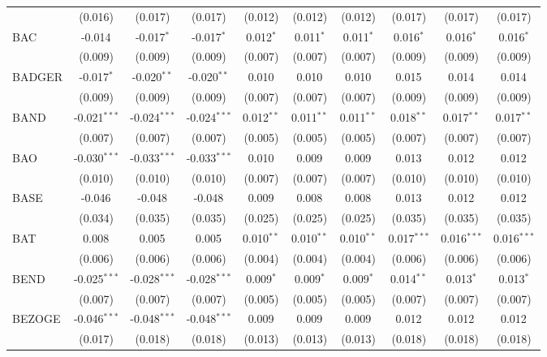 \begin{table}[!htbp]
\begin{tabular}{@{\extracolsep{5pt}}lccccccccc}
  & (0.016) & (0.017) & (0.017) & (0.012) & (0.012) & (0.012) & (0.017) & (0.017) & (0.017) \\
 BAC & -0.014$^{}$ & -0.017$^{*}$ & -0.017$^{*}$ & 0.012$^{*}$ & 0.011$^{*}$ & 0.011$^{*}$ & 0.016$^{*}$ & 0.016$^{*}$ & 0.016$^{*}$ \\
  & (0.009) & (0.009) & (0.009) & (0.007) & (0.007) & (0.007) & (0.009) & (0.009) & (0.009) \\
 BADGER & -0.017$^{*}$ & -0.020$^{**}$ & -0.020$^{**}$ & 0.010$^{}$ & 0.010$^{}$ & 0.010$^{}$ & 0.015$^{}$ & 0.014$^{}$ & 0.014$^{}$ \\
  & (0.009) & (0.009) & (0.009) & (0.007) & (0.007) & (0.007) & (0.009) & (0.009) & (0.009) \\
 BAND & -0.021$^{***}$ & -0.024$^{***}$ & -0.024$^{***}$ & 0.012$^{**}$ & 0.011$^{**}$ & 0.011$^{**}$ & 0.018$^{**}$ & 0.017$^{**}$ & 0.017$^{**}$ \\
  & (0.007) & (0.007) & (0.007) & (0.005) & (0.005) & (0.005) & (0.007) & (0.007) & (0.007) \\
 BAO & -0.030$^{***}$ & -0.033$^{***}$ & -0.033$^{***}$ & 0.010$^{}$ & 0.009$^{}$ & 0.009$^{}$ & 0.013$^{}$ & 0.012$^{}$ & 0.012$^{}$ \\
  & (0.010) & (0.010) & (0.010) & (0.007) & (0.007) & (0.007) & (0.010) & (0.010) & (0.010) \\
 BASE & -0.046$^{}$ & -0.048$^{}$ & -0.048$^{}$ & 0.009$^{}$ & 0.008$^{}$ & 0.008$^{}$ & 0.013$^{}$ & 0.012$^{}$ & 0.012$^{}$ \\
  & (0.034) & (0.035) & (0.035) & (0.025) & (0.025) & (0.025) & (0.035) & (0.035) & (0.035) \\
 BAT & 0.008$^{}$ & 0.005$^{}$ & 0.005$^{}$ & 0.010$^{**}$ & 0.010$^{**}$ & 0.010$^{**}$ & 0.017$^{***}$ & 0.016$^{***}$ & 0.016$^{***}$ \\
  & (0.006) & (0.006) & (0.006) & (0.004) & (0.004) & (0.004) & (0.006) & (0.006) & (0.006) \\
 BEND & -0.025$^{***}$ & -0.028$^{***}$ & -0.028$^{***}$ & 0.009$^{*}$ & 0.009$^{*}$ & 0.009$^{*}$ & 0.014$^{**}$ & 0.013$^{*}$ & 0.013$^{*}$ \\
  & (0.007) & (0.007) & (0.007) & (0.005) & (0.005) & (0.005) & (0.007) & (0.007) & (0.007) \\
 BEZOGE & -0.046$^{***}$ & -0.048$^{***}$ & -0.048$^{***}$ & 0.009$^{}$ & 0.009$^{}$ & 0.009$^{}$ & 0.012$^{}$ & 0.012$^{}$ & 0.012$^{}$ \\
  & (0.017) & (0.018) & (0.018) & (0.013) & (0.013) & (0.013) & (0.018) & (0.018) & (0.018) \\

\end{tabular}
\end{table}
